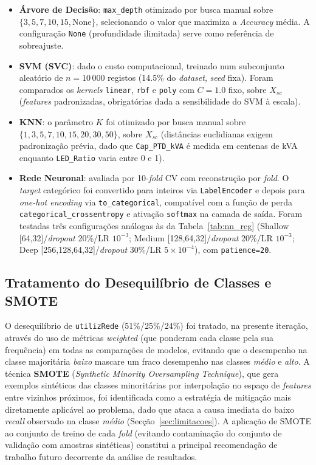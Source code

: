 \documentclass[conference]{IEEEtran}
\begin{document}
\begin{itemize}
    \item \textbf{Árvore de Decisão}: \texttt{max\_depth} otimizado por busca manual sobre $\{3, 5, 7, 10, 15, \text{None}\}$, selecionando o valor que maximiza a \textit{Accuracy} média. A configuração \texttt{None} (profundidade ilimitada) serve como referência de sobreajuste.
    \item \textbf{SVM (SVC)}: dado o custo computacional, treinado num subconjunto aleatório de $n=10\,000$ registos (14.5\% do \textit{dataset}, \textit{seed} fixa). Foram comparados os \textit{kernels} \texttt{linear}, \texttt{rbf} e \texttt{poly} com $C=1.0$ fixo, sobre $X_{sc}$ (\textit{features} padronizadas, obrigatórias dada a sensibilidade do SVM à escala).
    \item \textbf{KNN}: o parâmetro $K$ foi otimizado por busca manual sobre $\{1, 3, 5, 7, 10, 15, 20, 30, 50\}$, sobre $X_{sc}$ (distâncias euclidianas exigem padronização prévia, dado que \texttt{Cap\_PTD\_kVA} é medida em centenas de kVA enquanto \texttt{LED\_Ratio} varia entre 0 e 1).
    \item \textbf{Rede Neuronal}: avaliada por 10-\textit{fold} CV com reconstrução por \textit{fold}. O \textit{target} categórico foi convertido para inteiros via \texttt{LabelEncoder} e depois para \textit{one-hot encoding} via \texttt{to\_categorical}, compatível com a função de perda \texttt{categorical\_crossentropy} e ativação \texttt{softmax} na camada de saída. Foram testadas três configurações análogas às da Tabela~\ref{tab:nn_reg} (Shallow [64,32]/\textit{dropout} 20\%/LR $10^{-3}$; Medium [128,64,32]/\textit{dropout} 20\%/LR $10^{-3}$; Deep [256,128,64,32]/\textit{dropout} 30\%/LR $5\times10^{-4}$), com \texttt{patience=20}.
\end{itemize}

\subsection{Tratamento do Desequilíbrio de Classes e SMOTE}

O desequilíbrio de \texttt{utilizRede} (51\%/25\%/24\%) foi tratado, na presente iteração, através do uso de métricas \textit{weighted} (que ponderam cada classe pela sua frequência) em todas as comparações de modelos, evitando que o desempenho na classe majoritária \textit{baixo} mascare um fraco desempenho nas classes \textit{médio} e \textit{alto}. A técnica \textbf{SMOTE} (\textit{Synthetic Minority Oversampling Technique}), que gera exemplos sintéticos das classes minoritárias por interpolação no espaço de \textit{features} entre vizinhos próximos, foi identificada como a estratégia de mitigação mais diretamente aplicável ao problema, dado que ataca a causa imediata do baixo \textit{recall} observado na classe \textit{médio} (Secção~\ref{sec:limitacoes}). A aplicação de SMOTE ao conjunto de treino de cada \textit{fold} (evitando contaminação do conjunto de validação com amostras sintéticas) constitui a principal recomendação de trabalho futuro decorrente da análise de resultados.
\end{document}
